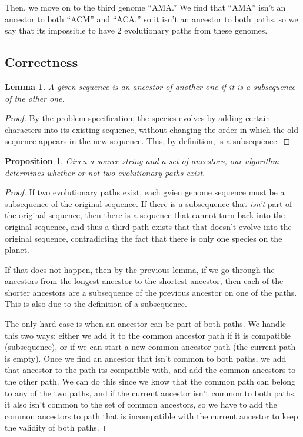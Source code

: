 \documentclass[12pt]{article}
\newtheorem{lemma}[theorem]{Lemma}
\newtheorem{proposition}[theorem]{Proposition}
\begin{document}
Then, we move on to the third genome ``AMA.'' We
find that ``AMA'' isn't an ancestor to both ``ACM''
and ``ACA,'' so it isn't an ancestor to both paths,
so we say that its impossible to have 2 evolutionary
paths from these genomes.

\subsection{Correctness}

\begin{lemma}
    A given sequence is an ancestor of another one if it
    is a subsequence of the other one.
\end{lemma}

\begin{proof}
    By the problem specification, the species evolves by
    adding certain characters into its existing sequence,
    without changing the order in which the old sequence
    appears in the new sequence. This, by definition, is
    a subsequence.
\end{proof}

\begin{proposition}
    Given a source string and a set of ancestors, our
    algorithm determines whether or not two evolutionary
    paths exist.
\end{proposition}

\begin{proof}
    If two evolutionary paths exist, each gvien genome
    sequence must be a subsequence of the original sequence.
    If there is a subsequence that {\em isn't} part of
    the original sequence, then there is a sequence
    that cannot turn back into the original sequence,
    and thus a third path exists that that doesn't evolve
    into the original sequence, contradicting the fact
    that there is only one species on the planet.

    If that does not happen, then by the previous lemma,
    if we go through the ancestors from the longest
    ancestor to the shortest ancestor, then each of the
    shorter ancestors are a subsequence of the
    previous ancestor on one of the paths. This is also
    due to the definition of a subsequence.

    The only hard case is when an ancestor can be part
    of both paths. We handle this two ways: either
    we add it to the common ancestor path if it is
    compatible (subsequence), or if we can start
    a new common ancestor path (the current path is empty).
    Once we find an ancestor that isn't common to both
    paths, we add that ancestor to the path its compatible
    with, and add the common ancestors to the other path.
    We can do this since we know that the common path can
    belong to any of the two paths, and if the current
    ancestor isn't common to both paths, it also isn't
    common to the set of common ancestors, so we have
    to add the common ancestors to path that is incompatible
    with the current ancestor to keep the validity of
    both paths.
\end{proof}
\end{document}
